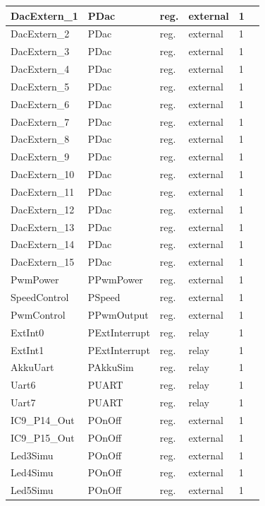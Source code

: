 \begin{tabular}[ht]{|l|l|l|l|l|p{5cm}|}
\hline
DacExtern\_1 & PDac & reg. & external & 1 & \\
\hline
DacExtern\_2 & PDac & reg. & external & 1 & \\
\hline
DacExtern\_3 & PDac & reg. & external & 1 & \\
\hline
DacExtern\_4 & PDac & reg. & external & 1 & \\
\hline
DacExtern\_5 & PDac & reg. & external & 1 & \\
\hline
DacExtern\_6 & PDac & reg. & external & 1 & \\
\hline
DacExtern\_7 & PDac & reg. & external & 1 & \\
\hline
DacExtern\_8 & PDac & reg. & external & 1 & \\
\hline
DacExtern\_9 & PDac & reg. & external & 1 & \\
\hline
DacExtern\_10 & PDac & reg. & external & 1 & \\
\hline
DacExtern\_11 & PDac & reg. & external & 1 & \\
\hline
DacExtern\_12 & PDac & reg. & external & 1 & \\
\hline
DacExtern\_13 & PDac & reg. & external & 1 & \\
\hline
DacExtern\_14 & PDac & reg. & external & 1 & \\
\hline
DacExtern\_15 & PDac & reg. & external & 1 & \\
\hline
PwmPower & PPwmPower & reg. & external & 1 & \\
\hline
SpeedControl & PSpeed & reg. & external & 1 & \\
\hline
PwmControl & PPwmOutput & reg. & external & 1 & \\
\hline
ExtInt0 & PExtInterrupt & reg. & relay & 1 & \\
\hline
ExtInt1 & PExtInterrupt & reg. & relay & 1 & \\
\hline
AkkuUart & PAkkuSim & reg. & relay & 1 & \\
\hline
Uart6 & PUART & reg. & relay & 1 & \\
\hline
Uart7 & PUART & reg. & relay & 1 & \\
\hline
IC9\_P14\_Out & POnOff & reg. & external & 1 & \\
\hline
IC9\_P15\_Out & POnOff & reg. & external & 1 & \\
\hline
Led3Simu & POnOff & reg. & external & 1 & \\
\hline
Led4Simu & POnOff & reg. & external & 1 & \\
\hline
Led5Simu & POnOff & reg. & external & 1 & \\

\end{tabular}
